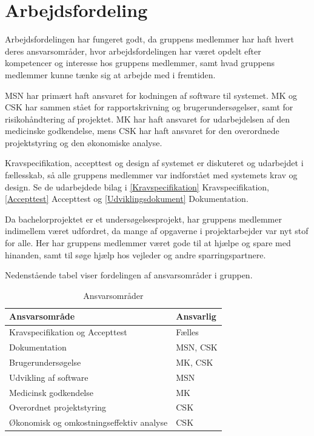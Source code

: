 \section{Arbejdsfordeling}
Arbejdsfordelingen har fungeret godt, da gruppens medlemmer har haft hvert deres ansvarsområder, hvor arbejdsfordelingen har været opdelt efter kompetencer og interesse hos gruppens medlemmer, samt hvad gruppens medlemmer kunne tænke sig at arbejde med i fremtiden.  

MSN har primært haft ansvaret for kodningen af software til systemet. MK og CSK har sammen stået for rapportskrivning og brugerundersøgelser, samt for risikohåndtering af projektet. MK har haft ansvaret for udarbejdelsen af den medicinske godkendelse, mens CSK har haft ansvaret for den overordnede projektstyring og den økonomiske analyse.

Kravspecifikation, accepttest og design af systemet er diskuteret og udarbejdet i fællesskab, så alle gruppens medlemmer var indforstået med systemets krav og design. Se de udarbejdede bilag i \ref{Kravspecifikation} Kravspecifikation, \ref{Accepttest} Accepttest og \ref{Udviklingsdokument} Dokumentation.

Da bachelorprojektet er et undersøgelsesprojekt, har gruppens medlemmer indimellem været udfordret, da mange af opgaverne i projektarbejder var nyt stof for alle. Her har gruppens medlemmer været gode til at hjælpe og spare med hinanden, samt til søge hjælp hos vejleder og andre sparringspartnere.  

Nedenstående tabel viser fordelingen af ansvarsområder i gruppen. 

\begin{table}[h]
\centering
\begin{tabular}{|l| p{}|}
\hline
\textbf{Ansvarsområde} &  \textbf{Ansvarlig} \\\hline
Kravspecifikation og Accepttest & Fælles \\\hline
Dokumentation & MSN, CSK\\\hline
Brugerundersøgelse & MK, CSK \\\hline
Udvikling af software & MSN\\\hline
Medicinsk godkendelse & MK \\\hline
Overordnet projektstyring & CSK \\\hline
Økonomisk og omkostningseffektiv analyse & CSK \\\hline
\end{tabular}
\caption{Ansvarsområder}
\end{table}

